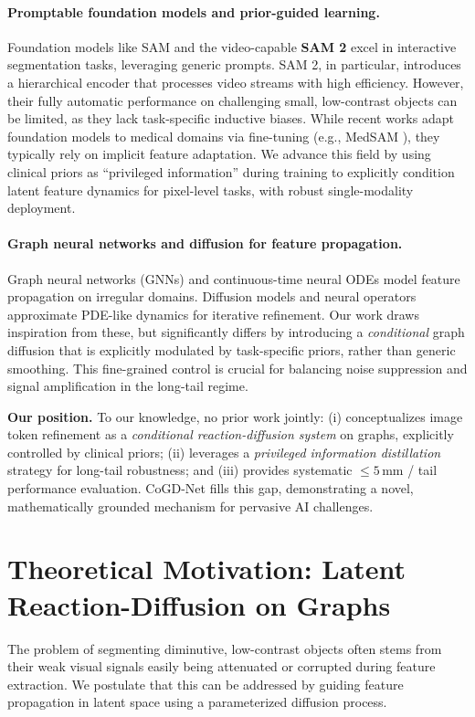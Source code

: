 \documentclass{article}
\begin{document}
\paragraph{Promptable foundation models and prior-guided learning.}
Foundation models like SAM \cite{Kirillov2023SAM} and the video-capable \textbf{SAM 2} \cite{Ravi2024SAM2} excel in interactive segmentation tasks, leveraging generic prompts. SAM 2, in particular, introduces a hierarchical encoder that processes video streams with high efficiency. However, their fully automatic performance on challenging small, low-contrast objects can be limited, as they lack task-specific inductive biases. While recent works adapt foundation models to medical domains via fine-tuning (e.g., MedSAM \cite{Ma2023MedSAM}), they typically rely on implicit feature adaptation. We advance this field by using clinical priors as ``privileged information'' during training to explicitly condition latent feature dynamics for pixel-level tasks, with robust single-modality deployment.

\paragraph{Graph neural networks and diffusion for feature propagation.}
Graph neural networks (GNNs) \cite{Kipf2017GCN,Velickovic2018GAT} and continuous-time neural ODEs \cite{Chen2018NeuralODE} model feature propagation on irregular domains. Diffusion models \cite{Ho2020DDPM} and neural operators \cite{Li2021FNO} approximate PDE-like dynamics for iterative refinement. Our work draws inspiration from these, but significantly differs by introducing a \emph{conditional} graph diffusion that is explicitly modulated by task-specific priors, rather than generic smoothing. This fine-grained control is crucial for balancing noise suppression and signal amplification in the long-tail regime.

\medskip
\noindent
\textbf{Our position.}
To our knowledge, no prior work jointly: (i) conceptualizes image token refinement as a \emph{conditional reaction-diffusion system} on graphs, explicitly controlled by clinical priors; (ii) leverages a \emph{privileged information distillation} strategy for long-tail robustness; and (iii) provides systematic $\leq 5$\,mm / tail performance evaluation. CoGD-Net fills this gap, demonstrating a novel, mathematically grounded mechanism for pervasive AI challenges.

\section{Theoretical Motivation: Latent Reaction-Diffusion on Graphs}
\label{sec:theory}
The problem of segmenting diminutive, low-contrast objects often stems from their weak visual signals easily being attenuated or corrupted during feature extraction. We postulate that this can be addressed by guiding feature propagation in latent space using a parameterized diffusion process.
\end{document}
